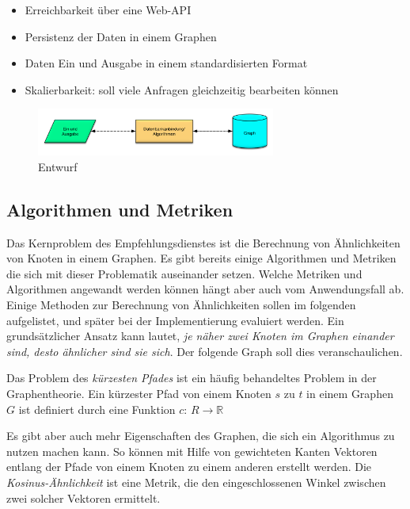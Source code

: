 \begin{itemize}
	\item Erreichbarkeit über eine Web-API 
	\item Persistenz der Daten in einem Graphen	
	\item Daten Ein und Ausgabe in einem standardisierten Format 
	\item Skalierbarkeit: soll viele Anfragen gleichzeitig bearbeiten können
\end{itemize}

\begin{figure}[htb]
 \centering
 \includegraphics[width=0.7\textwidth,angle=0]{abb/Entwurf}
 \caption[Beschreibung]{Entwurf}
\label{fig:Entwurf}
\end{figure}



\subsection{Algorithmen und Metriken}

Das Kernproblem des Empfehlungsdienstes ist die Berechnung von Ähnlichkeiten von Knoten in einem Graphen. Es gibt bereits einige Algorithmen und Metriken die sich mit dieser Problematik auseinander setzen. Welche Metriken und Algorithmen angewandt werden können hängt aber auch vom Anwendungsfall ab. Einige Methoden zur Berechnung von Ähnlichkeiten sollen im folgenden aufgelistet, und später bei der Implementierung evaluiert werden. Ein grundsätzlicher Ansatz kann lautet,\textit{ je näher zwei Knoten im Graphen einander sind, desto ähnlicher sind sie sich}. Der folgende Graph soll dies veranschaulichen. 
\newline

Das Problem des \textit{kürzesten Pfades} ist ein häufig behandeltes Problem in der Graphentheorie. Ein kürzester Pfad von einem Knoten $s$ zu $t$ in einem Graphen $G$ ist definiert durch eine Funktion $c$: $R \rightarrow \mathbb{R}$
\vspace{1em}

Es gibt aber auch mehr Eigenschaften des Graphen, die sich ein Algorithmus zu nutzen machen kann. So können mit Hilfe von gewichteten Kanten Vektoren entlang der Pfade von einem Knoten zu einem anderen erstellt werden. Die \textit{Kosinus-Ähnlichkeit} ist eine Metrik, die den eingeschlossenen Winkel zwischen zwei solcher Vektoren ermittelt.
\vspace{1em}

